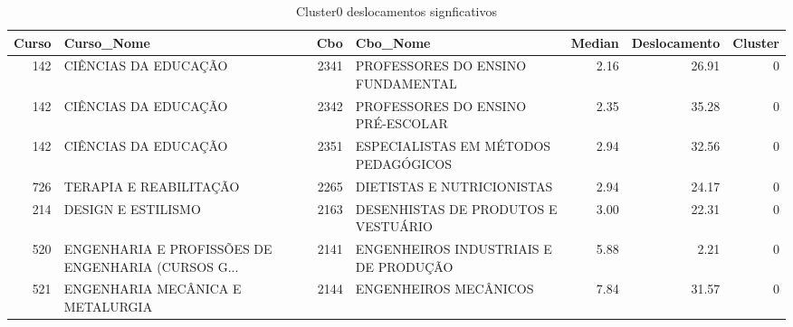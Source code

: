 \begin{table}
\centering
\caption{Cluster0 deslocamentos signficativos }
\label{tab:Salarios_Cluster0}
\begin{tabular}{rlrlrrr}
\toprule
 Curso &                                         Curso\_Nome &  Cbo &                              Cbo\_Nome &  Median &  Deslocamento &  Cluster \\
\midrule
   142 &                               CIÊNCIAS DA EDUCAÇÃO & 2341 &     PROFESSORES DO ENSINO FUNDAMENTAL &    2.16 &         26.91 &        0 \\
   142 &                               CIÊNCIAS DA EDUCAÇÃO & 2342 &     PROFESSORES DO ENSINO PRÉ-ESCOLAR &    2.35 &         35.28 &        0 \\
   142 &                               CIÊNCIAS DA EDUCAÇÃO & 2351 &  ESPECIALISTAS EM MÉTODOS PEDAGÓGICOS &    2.94 &         32.56 &        0 \\
   726 &                             TERAPIA E REABILITAÇÃO & 2265 &            DIETISTAS E NUTRICIONISTAS &    2.94 &         24.17 &        0 \\
   214 &                                 DESIGN E ESTILISMO & 2163 &  DESENHISTAS DE PRODUTOS E  VESTUÁRIO &    3.00 &         22.31 &        0 \\
   520 & ENGENHARIA E PROFISSÕES DE ENGENHARIA (CURSOS G... & 2141 & ENGENHEIROS INDUSTRIAIS E DE PRODUÇÃO &    5.88 &          2.21 &        0 \\
   521 &                   ENGENHARIA MECÂNICA E METALURGIA & 2144 &                 ENGENHEIROS MECÂNICOS &    7.84 &         31.57 &        0 \\
\bottomrule
\end{tabular}
\end{table}
